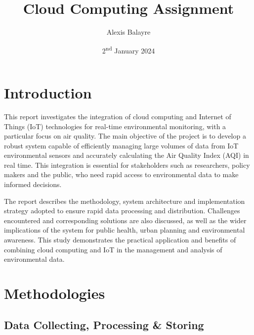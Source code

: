 \documentclass[12pt,oneside]{book} %
\title{Cloud Computing Assignment}
\author{Alexis Balayre}
\date{2\textsuperscript{nd} January 2024}
\begin{document}
\frontmatter

\maketitle

{
    \clearpage
    \singlespacing
    {
        \tableofcontents
    }
    \clearpage

    \listoffigures

    \listoftables
}

\mainmatter
\pagestyle{fancy}
\fancyhead[L]{\nouppercase{\leftmark}}
\fancyhead[R]{\nouppercase{\rightmark}}

\chapter{Introduction}
This report investigates the integration of cloud computing and Internet of
Things (IoT) technologies for real-time environmental monitoring, with a
particular focus on air quality. The main objective of the project is to
develop a robust system capable of efficiently managing large volumes of data
from IoT environmental sensors and accurately calculating the Air Quality Index
(AQI) in real time. This integration is essential for stakeholders such as
researchers, policy makers and the public, who need rapid access to
environmental data to make informed decisions.

The report describes the methodology, system architecture and implementation
strategy adopted to ensure rapid data processing and distribution. Challenges
encountered and corresponding solutions are also discussed, as well as the
wider implications of the system for public health, urban planning and
environmental awareness. This study demonstrates the practical application and
benefits of combining cloud computing and IoT in the management and analysis of
environmental data.

\chapter{Methodologies}\label{chap:one}

\section{Data Collecting, Processing \& Storing}
\end{document}
